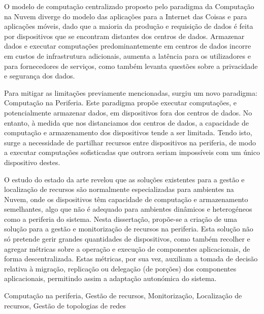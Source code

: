 
O modelo de computação centralizado proposto pelo paradigma da Computação na Nuvem diverge do modelo das aplicações para a Internet das Coisas e para aplicações móveis, dado que a maioria da produção e requisição de dados é feita por dispositivos que se encontram distantes dos centros de dados. Armazenar dados e executar computações predominantemente em centros de dados incorre em custos de infrastrutura adicionais, aumenta a latência para os utilizadores e para fornecedores de serviços, como também levanta questões sobre a privacidade e segurança dos dados.

Para mitigar as limitações previamente mencionadas, surgiu um novo paradigma: Computação na Periferia. Este paradigma propõe executar computações, e potencialmente armazenar dados, em dispositivos fora dos centros de dados. No entanto, à medida que nos distanciamos dos centros de dados, a capacidade de computação e armazenamento dos dispositivos tende a ser limitada. Tendo isto, surge a necessidade de partilhar recursos entre dispositivos na periferia, de modo a executar computações sofisticadas que outrora seriam impossíveis com um único dispositivo destes.

O estudo do estado da arte revelou que as soluções existentes para a gestão e localização de recursos são normalmente especializadas para ambientes na Nuvem, onde os dispositivos têm capacidade de computação e armazenamento semelhantes, algo que não é adequado para ambientes dinâmicos e heterogéneos como a periferia do sistema. 
Nesta dissertação, propõe-se a criação de uma solução para a gestão e monitorização de recursos na periferia. Esta solução não só pretende gerir grandes quantidades de dispositivos, como também recolher e agregar métricas sobre a operação e execução de componentes aplicacionais, de forma descentralizada.
Estas métricas, por sua vez, auxiliam a tomada de decisão relativa à migração, replicação ou delegação (de porções) dos componentes aplicacionais, permitindo assim a adaptação autonómica do sistema.


\begin{keywords}

    
    Computação na periferia, Gestão de recursos, Monitorização, Localização de recursos, Gestão de topologias de redes

\end{keywords}
